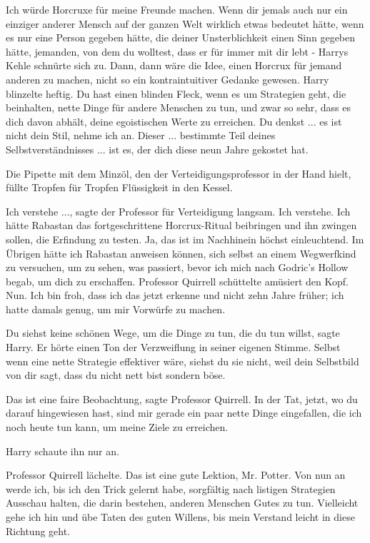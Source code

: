 \glqq{}Ich würde Horcruxe für meine Freunde machen. Wenn dir jemals auch nur ein
einziger anderer Mensch auf der ganzen Welt wirklich etwas bedeutet hätte, wenn
es nur eine Person gegeben hätte, die deiner Unsterblichkeit einen Sinn gegeben
hätte, jemanden, von dem du wolltest, dass er für immer mit dir lebt -\grqq{} Harrys
Kehle schnürte sich zu. \glqq{}Dann, dann wäre die Idee, einen Horcrux für jemand
anderen zu machen, nicht so ein kontraintuitiver Gedanke gewesen.\grqq{} Harry
blinzelte heftig. \glqq{}Du hast einen blinden Fleck, wenn es um Strategien geht,
die beinhalten, nette Dinge für andere Menschen zu tun, und zwar so sehr, dass
es dich davon abhält, deine egoistischen Werte zu erreichen. Du denkst ... es ist
nicht dein Stil, nehme ich an. Dieser ... bestimmte Teil deines
Selbstverständnisses ... ist es, der dich diese neun Jahre gekostet hat.\grqq{}

Die Pipette mit dem Minzöl, den der Verteidigungsprofessor in der Hand hielt,
füllte Tropfen für Tropfen Flüssigkeit in den Kessel.

\glqq{}Ich verstehe ...\grqq{}, sagte der Professor für Verteidigung langsam.
\glqq{}Ich verstehe. Ich hätte Rabastan das fortgeschrittene Horcrux-Ritual
beibringen und ihn zwingen sollen, die Erfindung zu testen. Ja, das ist im
Nachhinein höchst einleuchtend. Im Übrigen hätte ich Rabastan anweisen können,
sich selbst an einem Wegwerfkind zu versuchen, um zu sehen, was passiert, bevor
ich mich nach Godric's Hollow begab, um dich zu erschaffen.\grqq{} Professor Quirrell
schüttelte amüsiert den Kopf. \glqq{}Nun. Ich bin froh, dass ich das jetzt
erkenne und nicht zehn Jahre früher; ich hatte damals genug, um mir Vorwürfe zu
machen.\grqq{}

\glqq{}Du siehst keine schönen Wege, um die Dinge zu tun, die du tun
willst\grqq{}, sagte Harry. Er hörte einen Ton der Verzweiflung in seiner
eigenen Stimme. \glqq{}Selbst wenn eine nette Strategie effektiver wäre, siehst
du sie nicht, weil dein Selbstbild von dir sagt, dass du nicht nett bist sondern
böse.\grqq{}

\glqq{}Das ist eine faire Beobachtung\grqq{}, sagte Professor Quirrell. \glqq{}In
der Tat, jetzt, wo du darauf hingewiesen hast, sind mir gerade ein paar nette
Dinge eingefallen, die ich noch heute tun kann, um meine Ziele zu erreichen.\grqq{}

Harry schaute ihn nur an.

Professor Quirrell lächelte. \glqq{}Das ist eine gute Lektion, Mr. Potter. Von
nun an werde ich, bis ich den Trick gelernt habe, sorgfältig nach listigen
Strategien Ausschau halten, die darin bestehen, anderen Menschen Gutes zu tun.
Vielleicht gehe ich hin und übe Taten des guten Willens, bis mein Verstand
leicht in diese Richtung geht.\grqq{}

